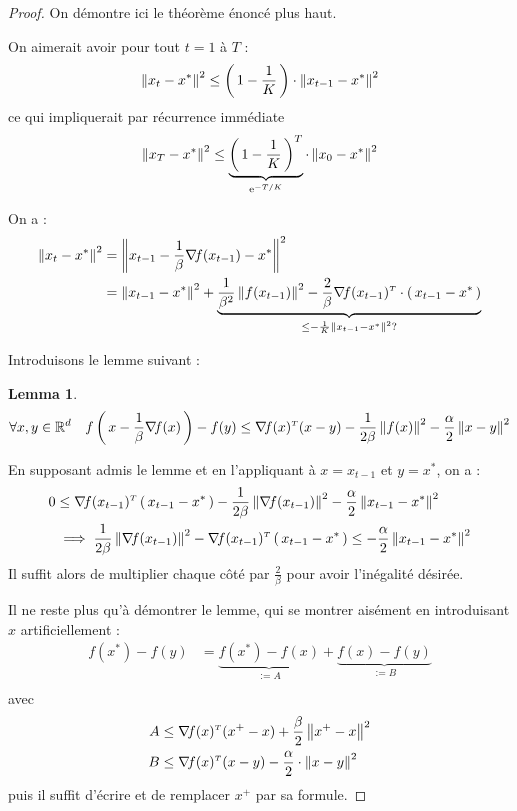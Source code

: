 \documentclass[11pt]{article}
\newcommand{\transpose}[1]{\ensuremath{#1^{\scriptscriptstyle T}}}
\newcommand{\dotpourvariable}{\:\cdot\:}
\newcommand{\ifempty}[3]{\ifx\hfuzz#1\hfuzz #2 \else #3\fi}
\newcommand{\norme}[1]{\left\lVert\ifempty{#1}{\dotpourvariable}{#1}\right\rVert}
\newcommand{\prt}[1]{\left( \, #1  \, \right)}
\newcommand{\R}{\mathbb{R}} %
\newcommand*{\e}{\ensuremath{\mathrm{e}}}
\newtheorem{lemma}[theorem]{Lemma}
\begin{document}
  \begin{proof}
    On démontre ici le théorème énoncé plus haut.

    On aimerait avoir pour tout $t=1$ à $T$ :
    \begin{equation}
      \norme{x_t-x^{*}}^2\leq \prt{1- \frac{1}{K}} \cdot \norme{x_{t-1}-x^{*}}^2
    \end{equation}
    ce qui impliquerait par récurrence immédiate
    \begin{equation}
      \norme{x_T-x^{*}}^2\leq \underbrace{\prt{1- \frac{1}{K}}^T}_{\e^{-T/K}}\cdot \norme{x_{0}-x^{*}}^2
    \end{equation}

    On a :
    \begin{align*}
      \norme{x_t-x^{*}}^2&= \norme{x_{t-1}-\frac{1}{\beta} \nabla\! f(x_{t-1})-x^{*}}^2\\
      &= \norme{x_{t-1}-x^{*}}^2+\underbrace{\frac{1}{\beta^2} \norme{f(x_{t-1})}^2-
      \frac{2}{\beta}\transpose{\nabla\! f(x_{t-1})} \cdot \prt{x_{t-1}-x^{*}}}_{\leq
      -\frac{1}{K}\norme{x_{t-1}-x^{*}}^2?
      }
    \end{align*}

    Introduisons le lemme suivant :
    \begin{lemma}
      \begin{equation}
        \forall x, y \in \R^d \quad f\prt{x-\frac{1}{\beta} \nabla\! f(x)} - f(y)
        \leq \transpose{\nabla\! f(x)} (x-y)-\frac{1}{2 \beta } \norme{f(x)}^2
        - \frac{\alpha}{2} \norme{x-y}^2
      \end{equation}
    \end{lemma}

    En supposant admis le lemme et en l'appliquant à $x = x_{t-1}$ et $y = x^{*}$,
    on a :
    \begin{align*}
0 &\leq \transpose{\nabla\! f(x_{t-1})}\prt{x_{t-1}-x^{*}}
-\frac{1}{2 \beta} \norme{\nabla\! f(x_{t-1})}^2 - \frac{\alpha}{2} \norme{x_{t-1}-x^{*}}^2\\
&\implies \frac{1}{2\beta } \norme{\nabla\! f(x_{t-1})}^2-\transpose{\nabla\! f(x_{t-1})}\prt{x_{t-1}-x^{*}} \leq - \frac{\alpha}{2} \norme{x_{t-1}-x^{*}}^2
    \end{align*}
Il suffit alors de multiplier chaque côté par $\frac{2}{\beta}$ pour avoir l'inégalité désirée.

Il ne reste plus qu'à démontrer le lemme, qui se montrer aisément en introduisant $x$
artificiellement :
\begin{align*}
  f(x^{*})-f(y)&= \underbrace{f(x^{*})-f(x)}_{:=A}+
  \underbrace{f(x)-f(y)}_{:=B}\\
  \end{align*}
  avec
  \begin{align*}
    A &\leq \transpose{\nabla\! f(x)}(x^+-x)+ \frac{\beta}{2} \norme{x^+-x}^2\\
    B &\leq \transpose{\nabla\! f(x)}(x-y)-\frac{\alpha}{2} \cdot \norme{x-y}^2
  \end{align*}
  puis il suffit d'écrire et de remplacer $x^+$ par sa formule.

  \end{proof}
\end{document}
